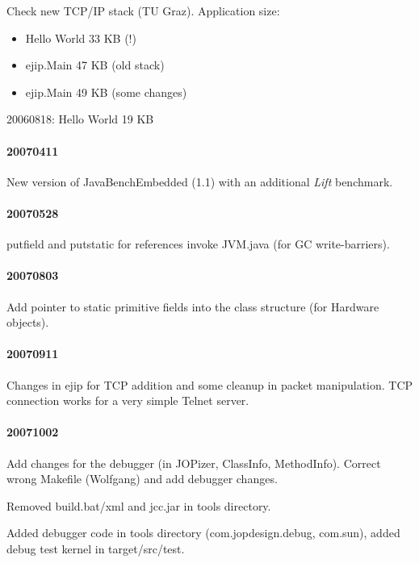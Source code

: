 \documentclass[a4paper,12pt]{scrartcl}
\begin{document}
Check new TCP/IP stack (TU Graz). Application size:
\begin{itemize}
    \item Hello World 33 KB (!)
    \item ejip.Main 47 KB (old stack)
    \item ejip.Main 49 KB (some changes)
\end{itemize}

20060818: Hello World 19 KB

%
%

\paragraph{20070411}

New version of JavaBenchEmbedded (1.1) with an additional \emph{Lift}
benchmark.

\paragraph{20070528}

putfield and putstatic for references invoke JVM.java (for GC
write-barriers).

\paragraph{20070803}

Add pointer to static primitive fields into the class structure (for
Hardware objects).

\paragraph{20070911} Changes in ejip for TCP addition and some
cleanup in packet manipulation. TCP connection works for a very simple
Telnet server.

\paragraph{20071002} Add changes for the debugger (in JOPizer, ClassInfo, MethodInfo).
Correct wrong Makefile (Wolfgang) and add debugger changes.

Removed build.bat/xml and jcc.jar in tools directory.

Added debugger code in tools directory (com.jopdesign.debug,
com.sun), added debug test kernel in target/src/test.
\end{document}
